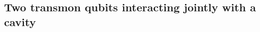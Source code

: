 
\subsection{Two transmon qubits interacting jointly with a cavity}
\label{subsec:pe_transmon_model}

